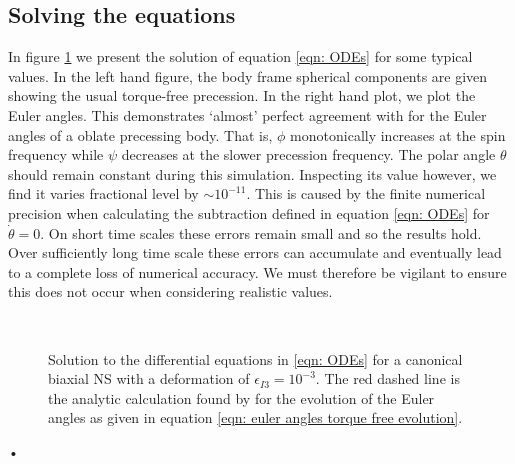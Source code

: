 \documentclass[/home/greg/Thesis/main/main.tex]{subfiles}
\begin{document}
\subsection{Solving the equations}
In figure \ref{fig: biaxial body no torque} we present the solution of equation
\eqref{eqn: ODEs} for some typical values. In the left hand figure, the body
frame spherical components are given showing the usual torque-free precession.
In the right hand plot, we plot the Euler angles. This demonstrates `almost'
perfect agreement with  for the Euler angles of a oblate
precessing body. That is, $\phi$ monotonically increases at the spin frequency
while $\psi$ decreases at the slower precession frequency. The polar angle
$\theta$ should remain constant during this simulation. Inspecting its value
however, we find it varies fractional level by $\sim 10^{-11}$.
This is caused by the finite numerical precision when calculating the
subtraction defined in equation \eqref{eqn: ODEs} for $\dot{\theta}=0$. On
short time scales these errors remain small and so
the results hold.  Over sufficiently long time scale these errors can
accumulate and eventually lead to a complete loss of numerical accuracy. We
must therefore be vigilant to ensure this does not occur when considering
realistic values.
\begin{figure}[ht]
    \centering
{} \\
\caption{Solution to the differential equations in \eqref{eqn: ODEs} for a
canonical biaxial NS with a deformation of $\epsilon_{I3} = 10^{-3}$. The red
dashed line is the analytic calculation found by \citet{Jones2001} for the
evolution of the Euler angles as given in equation 
\eqref{eqn: euler angles torque free evolution}.}
\label{fig: biaxial body no torque}
\end{figure}•
\end{document}
